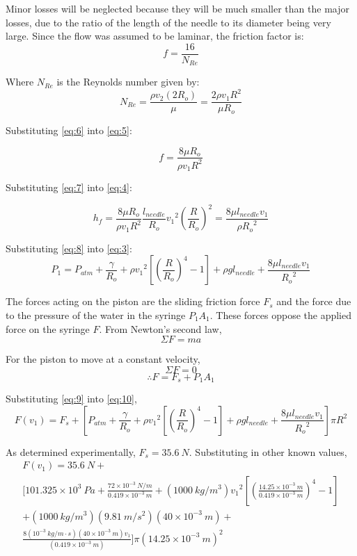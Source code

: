 \documentclass{article}
\begin{document}
Minor losses will be neglected because they will be much smaller than the major losses, due to the ratio of the length of the needle to its diameter being very large. Since the flow was assumed to be laminar, the friction factor is:
\[ f = \frac{16}{N_{Re}} \tag{2-5} \label{eq:5} \]

Where $N_{Re}$ is the Reynolds number given by:
\[ N_{Re} = \frac{\rho v_{2} (2R_{o})}{\mu} = \frac{2 \rho v_{1} R^{2}}{\mu R_{o}} \tag{2-6} \label{eq:6} \]

Substituting \eqref{eq:6} into \eqref{eq:5}:

\[ f = \frac{8 \mu R_{o}}{\rho v_{1} R^{2}} \tag{2-7} \label{eq:7} \]

Substituting \eqref{eq:7} into \eqref{eq:4}:

\[ h_{f} = \frac{8 \mu R_{o}}{\rho v_{1} R^{2}} \frac{l_{needle}}{R_{o}} {v_{1}}^2 \left(\frac{R}{R_{o}}\right)^2 = \frac{8 \mu l_{needle} v_{1} }{\rho {R_{o}}^2} \tag{2-8} \label{eq:8} \]

Substituting \eqref{eq:8} into \eqref{eq:3}:
\[ P_{1} = P_{atm} + \frac{\gamma}{R_{o}} + \rho{v_{1}}^2\left[\left(\frac{R}{R_{o}}\right)^4  - 1 \right] + \rho gl_{needle} + \frac{8 \mu l_{needle} v_{1} }{{R_{o}}^2} \tag{2-9} \label{eq:9} \]

The forces acting on the piston are the sliding friction force $F_{s}$ and the force due to the pressure of the water in the syringe $P_{1}A_{1}$. These forces oppose the applied force on the syringe $F$. From Newton's second law,
\[ \Sigma F = ma \]

For the piston to move at a constant velocity,
\[ \Sigma F = 0 \]
\[ \therefore F = F_{s} + P_{1}A_{1} \tag{2-10} \label{eq:10} \]

Substituting \eqref{eq:9} into \eqref{eq:10},
\[ F(v_{1}) = F_{s} + \left[P_{atm} + \frac{\gamma}{R_{o}} + \rho{v_{1}}^2\left[\left(\frac{R}{R_{o}}\right)^4  - 1 \right] + \rho gl_{needle} + \frac{8 \mu l_{needle} v_{1} }{{R_{o}}^2} \right] \pi R^{2}\]

As determined experimentally, $F_{s} = 35.6 \ N$. Substituting in other known values,
\begin{multline*}
F(v_{1}) = 35.6 \ N + \\ \bigg[ 101.325 \times 10^{3} \ Pa + \frac{72 \times 10^{-3} \ N/m}{0.419 \times 10^{-3} \ m} +\left(1000 \ kg/m^3 \right) {v_{1}}^2 \left[\left(\frac{14.25 \times 10^{-3} \ m}{0.419 \times 10^{-3} \ m}\right)^4  - 1 \right] \\ + \left(1000 \ kg/m^3 \right) \left( 9.81 \ m/s^2 \right) \left( 40 \times 10^{-3} \ m \right) + \\ \frac{8 \left( 10^{-3} \ kg/m \cdot s \right) \left( 40 \times 10^{-3} \ m \right) v_{1}}{\left( 0.419 \times 10^{-3} \ m \right)} \bigg] \pi {\left( 14.25 \times 10^{-3} \ m \right)}^{2}
\end{multline*}
\end{document}
